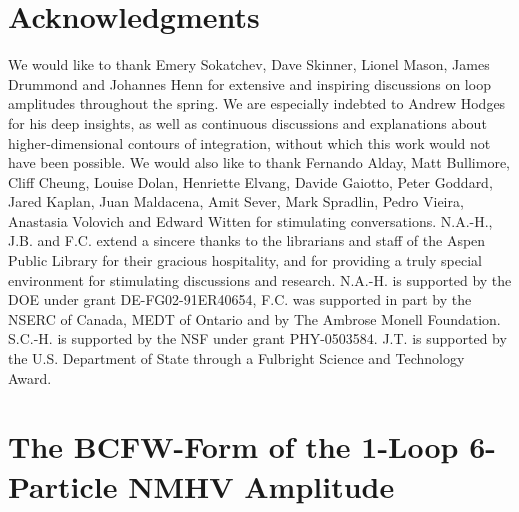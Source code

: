 \documentclass[11pt, reqno]{article}
\begin{document}
\section*{Acknowledgments}

We would like to thank Emery Sokatchev, Dave Skinner, Lionel Mason,
James Drummond and Johannes Henn for extensive and inspiring
discussions on loop amplitudes throughout the spring. We are
especially indebted to Andrew Hodges for his deep insights, as well
as continuous discussions and explanations about higher-dimensional
contours of integration, without which this work would not have been
possible. We would also like to thank Fernando Alday, Matt Bullimore, Cliff Cheung,
Louise Dolan, Henriette Elvang, Davide Gaiotto, Peter Goddard, Jared Kaplan, Juan
Maldacena, Amit Sever, Mark Spradlin, Pedro Vieira, Anastasia Volovich
and Edward Witten for stimulating conversations. N.A.-H., J.B. and
F.C. extend a sincere thanks to the librarians and staff of the
Aspen Public Library for their gracious hospitality, and for
providing a truly special environment for stimulating discussions
and research. N.A.-H. is supported by the DOE under grant DE-FG02-91ER40654, F.C.
was supported in part by the NSERC of Canada, MEDT of Ontario and by
The Ambrose Monell Foundation. S.C.-H. is supported by the NSF under grant PHY-0503584.
J.T. is supported by the U.S. Department of State through a Fulbright Science and Technology
Award.

\appendix
\newpage

\section{The BCFW-Form of the 1-Loop 6-Particle NMHV Amplitude}\label{bcfw_6pt}
\end{document}
